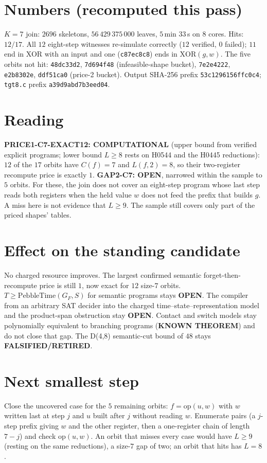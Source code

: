 \documentclass[11pt]{article}
\begin{document}
\section*{Numbers (recomputed this pass)}
$K=7$ join: $2696$ skeletons, $56\,429\,375\,000$ leaves, $5$\,min $33$\,s on $8$ cores. Hits: $12/17$. All $12$ eight-step witnesses re-simulate correctly ($12$ verified, $0$ failed); $11$ end in XOR with an input and one (\texttt{c87ec8c8}) ends in $\mathrm{XOR}(g,w)$. The five orbits not hit: \texttt{48dc33d2}, \texttt{7d694f48} (infeasible-shape bucket), \texttt{7e2e4222}, \texttt{e2b8302e}, \texttt{ddf51ca0} (price-2 bucket). Output SHA-256 prefix \texttt{53c1296156ffc0c4}; \texttt{tgt8.c} prefix \texttt{a39d9abd7b3eed04}.

\section*{Reading}
\textbf{PRICE1-C7-EXACT12: COMPUTATIONAL} (upper bound from verified explicit programs; lower bound $L\ge8$ rests on H0544 and the H0445 reductions): $12$ of the $17$ orbits have $C(f)=7$ and $L(f,2)=8$, so their two-register recompute price is exactly $1$.
\textbf{GAP2-C7: OPEN}, narrowed within the sample to $5$ orbits. For these, the join does not cover an eight-step program whose last step reads both registers when the held value $w$ does not feed the prefix that builds $g$. A miss here is not evidence that $L\ge9$. The sample still covers only part of the priced shapes' tables.

\section*{Effect on the standing candidate}
No charged resource improves. The largest confirmed semantic forget-then-recompute price is still $1$, now exact for $12$ size-$7$ orbits. $T\ge\mathrm{PebbleTime}(G_F,S)$ for semantic programs stays \textbf{OPEN}. The compiler from an arbitrary SAT decider into the charged time--state--representation model and the product-span obstruction stay \textbf{OPEN}. Contact and switch models stay polynomially equivalent to branching programs (\textbf{KNOWN THEOREM}) and do not close that gap. The D(4,8) semantic-cut bound of $48$ stays \textbf{FALSIFIED/RETIRED}.

\section*{Next smallest step}
Close the uncovered case for the $5$ remaining orbits: $f=\mathrm{op}(u,w)$ with $w$ written last at step $j$ and $u$ built after $j$ without reading $w$. Enumerate pairs (a $j$-step prefix giving $w$ and the other register, then a one-register chain of length $7-j$) and check $\mathrm{op}(u,w)$. An orbit that misses every case would have $L\ge9$ (resting on the same reductions), a size-$7$ gap of two; an orbit that hits has $L=8$.
\end{document}
